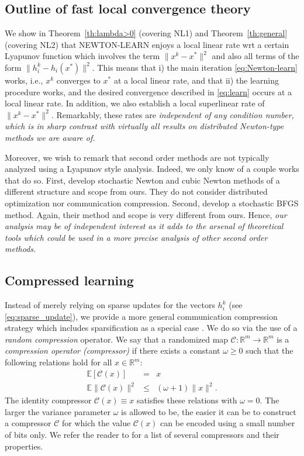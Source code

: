 \documentclass[12pt]{article}
\newcommand{\R}{\mathbb{R}}
\newcommand{\newalpha}{h}
\newcommand{\cC}{{\mathcal{C}}}
\begin{document}
\subsection{Outline of fast local convergence theory} We show in Theorem~\ref{th:lambda>0} (covering {\sf NL1}) and Theorem~\ref{th:general} (covering {\sf NL2}) that {\sf NEWTON-LEARN} enjoys a local linear rate wrt a certain Lyapunov function which  involves the term $\|x^k - x^*\|^2$ and also all terms of the form $\|h^k_i - \newalpha_i(x^*)\|^2$. This means that i) the main iteration \eqref{eq:Newton-learn} works, i.e., $x^k$ converges to $x^*$ at a local linear  rate, and that ii) the learning procedure works, and the desired convergence described in \eqref{eq:learn} occurs at a local linear rate. In addition, we also establish a local superlinear rate of $\|x^k - x^*\|^2$. Remarkably,  these rates are {\em independent of any condition number, which is  in sharp contrast with virtually all results on distributed Newton-type methods we are aware of.} 

Moreover, we wish to remark that second order methods are not typically analyzed using a Lyapunov style analysis. Indeed, we only know of a couple works that do so.  First, \citet{SN2019} develop stochastic Newton and cubic Newton methods of a different structure and scope from ours. They do not consider distributed optimization nor communication compression. Second, \citet{RBFGS2020} develop a stochastic BFGS method. Again, their method and scope is very different from ours. Hence, {\em our analysis may be of independent interest as it  adds to the arsenal of theoretical tools which could be used in a more precise analysis of other second order methods.}


\subsection{Compressed learning}

Instead of merely relying on sparse updates for the vectors $h_i^k$ (see \eqref{eq:sparse_update}), we provide a more general communication compression strategy which includes sparsification as a special case \citep{Alistarh17}. We do so via the use of a {\em random compression} operator.  We say that a randomized map $\cC:\R^m\to \R^m$ is  a {\em compression operator (compressor)} if  there exists a constant $\omega \geq 0$ such that the following relations hold for all $x\in \R^m$:
\begin{eqnarray} 
\mathbb{E}[\cC(x) ] &=& x \label{eq:unbiased} \\ 
\mathbb{E}\|\cC(x)\|^2 &\leq &(\omega + 1)\|x\|^2.\label{eq:omega-variance}
\end{eqnarray} 
The identity compressor $\cC(x)\equiv x$ satisfies these relations with $\omega=0$. The larger the variance parameter $\omega$ is allowed to be, the easier it can be to construct a compressor $\cC$ for which the value $\cC(x)$ can be encoded using a small number of bits only. We refer the reader to \citep{biased2020} for a list of several compressors and their properties.
\end{document}
